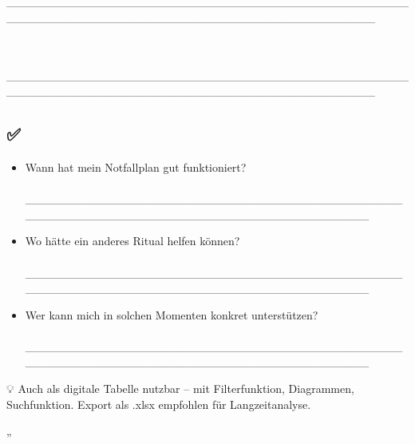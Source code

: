 \textbf{\textcolor{ctmmBlue}{\1}}\\
📝 \_\_\_\_\_\_\_\_\_\_\_\_\_\_\_\_\_\_\_\_\_\_\_\_\_\_\_\_\_\_\_\_\_\_\_\_\_\_\_\_\_\_\_\_\_\_\_\_\_\_\_\_\_\_\_\_\_\_\_\_\_\_\_\_\_\_\_\_\_\_\_\_\_\_\_\_\_\_\_\_\_\_\_\_\_\_\_\_\_\_\_\_

\textbf{\textcolor{ctmmBlue}{\1}}\\
📝 \_\_\_\_\_\_\_\_\_\_\_\_\_\_\_\_\_\_\_\_\_\_\_\_\_\_\_\_\_\_\_\_\_\_\_\_\_\_\_\_\_\_\_\_\_\_\_\_\_\_\_\_\_\_\_\_\_\_\_\_\_\_\_\_\_\_\_\_\_\_\_\_\_\_\_\_\_\_\_\_\_\_\_\_\_\_\_\_\_\_\_\_

\hfill\break
\hfill\break

\hypertarget{reflexions-fragen-1x-pro-woche-oder-nach-bedarf}{%
\subsection[ ✅ \ul{\textbf{\textcolor{ctmmBlue}{\1}}}]{\texorpdfstring{\protect\hypertarget{X96c50ee185aa33ef4dc8e8274a58067f345bb25}{}{} ✅ \ul{\textbf{\textcolor{ctmmBlue}{\1}}}}{ ✅ REFLEXIONS-FRAGEN (1x pro Woche oder nach Bedarf)}}\label{reflexions-fragen-1x-pro-woche-oder-nach-bedarf}}

\begin{itemize}[label=\textcolor{ctmmOrange}{\faArrowRight}]
\item
  Wann hat mein Notfallplan gut funktioniert?\\
  📝 \_\_\_\_\_\_\_\_\_\_\_\_\_\_\_\_\_\_\_\_\_\_\_\_\_\_\_\_\_\_\_\_\_\_\_\_\_\_\_\_\_\_\_\_\_\_\_\_\_\_\_\_\_\_\_\_\_\_\_\_\_\_\_\_\_\_\_\_\_\_\_\_\_\_\_\_\_\_\_\_\_\_\_\_\_\_
\item
  Wo hätte ein anderes Ritual helfen können?\\
  📝 \_\_\_\_\_\_\_\_\_\_\_\_\_\_\_\_\_\_\_\_\_\_\_\_\_\_\_\_\_\_\_\_\_\_\_\_\_\_\_\_\_\_\_\_\_\_\_\_\_\_\_\_\_\_\_\_\_\_\_\_\_\_\_\_\_\_\_\_\_\_\_\_\_\_\_\_\_\_\_\_\_\_\_\_\_\_
\item
  Wer kann mich in solchen Momenten konkret unterstützen?\\
  📝 \_\_\_\_\_\_\_\_\_\_\_\_\_\_\_\_\_\_\_\_\_\_\_\_\_\_\_\_\_\_\_\_\_\_\_\_\_\_\_\_\_\_\_\_\_\_\_\_\_\_\_\_\_\_\_\_\_\_\_\_\_\_\_\_\_\_\_\_\_\_\_\_\_\_\_\_\_\_\_\_\_\_\_\_\_\_
\end{itemize}

\hfill\break
\hfill\break

💡 \ul{\textbf{\textcolor{ctmmBlue}{\1}}} Auch als digitale Tabelle nutzbar -- mit Filterfunktion, Diagrammen, Suchfunktion. Export als .xlsx empfohlen für Langzeitanalyse.

\hfill\break
\hfill\break

„\textcolor{ctmmGreen}{\textit{\1}}
